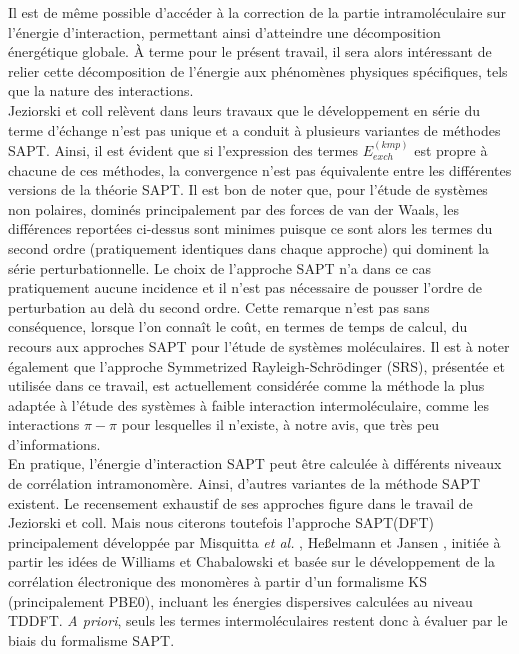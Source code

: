 	Il est de même possible d’accéder à la correction de la partie intramoléculaire sur l’énergie d’interaction, permettant ainsi d’atteindre une décomposition énergétique globale. À terme pour le présent travail, il sera alors intéressant de relier cette décomposition de l'énergie aux phénomènes physiques spécifiques, tels que la nature des interactions. \\
	
	Jeziorski et coll \cite{patkowski2004unified,jeziorski1994perturbation} relèvent dans leurs travaux que le développement en série du terme d’échange n’est pas unique et a conduit à plusieurs variantes de méthodes SAPT. Ainsi, il est évident que si l’expression des termes $E_{exch}^{(kmp)}$ est propre à chacune de ces méthodes, la convergence n'est pas équivalente entre les différentes versions de la théorie SAPT. Il est bon de noter que, pour l’étude de systèmes non polaires, dominés principalement par des forces de van der Waals, les différences reportées ci-dessus sont minimes puisque ce sont alors les termes du second ordre (pratiquement identiques dans chaque approche) qui dominent la série perturbationnelle. Le choix de l’approche SAPT n’a dans ce cas pratiquement aucune incidence et il n’est pas nécessaire de pousser l’ordre de perturbation au delà du second ordre. Cette remarque n’est pas sans conséquence, lorsque l’on connaît le coût, en termes de temps de calcul, du recours aux approches SAPT pour l’étude de systèmes moléculaires. Il est à noter également que l’approche Symmetrized Rayleigh-Schr\"{o}dinger (SRS), présentée et utilisée dans ce travail, est actuellement considérée comme la méthode la plus adaptée à l’étude des systèmes à faible interaction intermoléculaire, comme les interactions $\pi-\pi$ pour lesquelles il n’existe, à notre avis, que très peu d’informations.\\
	
	
	En pratique, l’énergie d'interaction SAPT peut être calculée à différents niveaux de corrélation intramonomère. Ainsi, d’autres variantes de la méthode SAPT existent.
	Le recensement exhaustif de ses approches figure dans le travail de Jeziorski et coll. Mais nous citerons toutefois l’approche SAPT(DFT) principalement développée par 
	Misquitta \textit{et al.} \cite{misquitta2005intermolecular}, Heßelmann et Jansen \cite{hesselmann2002first}, initiée à partir les idées de Williams et Chabalowski \cite{williams2001using} et basée sur le développement de la corrélation électronique des monomères à partir d’un formalisme KS (principalement PBE0), incluant les énergies dispersives calculées au niveau TDDFT. \textit{A priori}, seuls les termes intermoléculaires restent donc à évaluer par le biais du formalisme SAPT.\\
	

